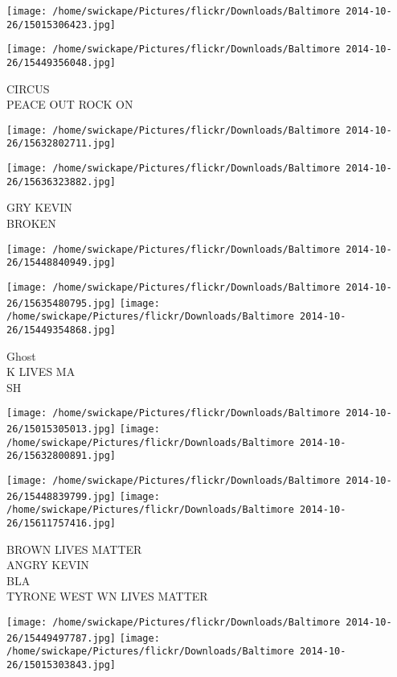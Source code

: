 \documentclass[10pt,letterpaper]{article}
\begin{document}
\texttt{[image: /home/swickape/Pictures/flickr/Downloads/Baltimore 2014-10-26/15015306423.jpg]}

\vspace{0.25in}
\texttt{[image: /home/swickape/Pictures/flickr/Downloads/Baltimore 2014-10-26/15449356048.jpg]}

CIRCUS\\
PEACE OUT ROCK ON
\pagebreak

\texttt{[image: /home/swickape/Pictures/flickr/Downloads/Baltimore 2014-10-26/15632802711.jpg]}

\vspace{0.25in}
\texttt{[image: /home/swickape/Pictures/flickr/Downloads/Baltimore 2014-10-26/15636323882.jpg]}

GRY KEVIN\\
BROKEN
\pagebreak

\texttt{[image: /home/swickape/Pictures/flickr/Downloads/Baltimore 2014-10-26/15448840949.jpg]}

\vspace{0.25in}
\texttt{[image: /home/swickape/Pictures/flickr/Downloads/Baltimore 2014-10-26/15635480795.jpg]}
\texttt{[image: /home/swickape/Pictures/flickr/Downloads/Baltimore 2014-10-26/15449354868.jpg]}

Ghost\\
K LIVES MA\\
SH
\pagebreak

\texttt{[image: /home/swickape/Pictures/flickr/Downloads/Baltimore 2014-10-26/15015305013.jpg]}
\texttt{[image: /home/swickape/Pictures/flickr/Downloads/Baltimore 2014-10-26/15632800891.jpg]}

\texttt{[image: /home/swickape/Pictures/flickr/Downloads/Baltimore 2014-10-26/15448839799.jpg]}
\texttt{[image: /home/swickape/Pictures/flickr/Downloads/Baltimore 2014-10-26/15611757416.jpg]}

BROWN LIVES MATTER\\
ANGRY KEVIN\\
BLA\\
TYRONE WEST WN LIVES MATTER
\pagebreak

\texttt{[image: /home/swickape/Pictures/flickr/Downloads/Baltimore 2014-10-26/15449497787.jpg]}
\texttt{[image: /home/swickape/Pictures/flickr/Downloads/Baltimore 2014-10-26/15015303843.jpg]}
\end{document}
